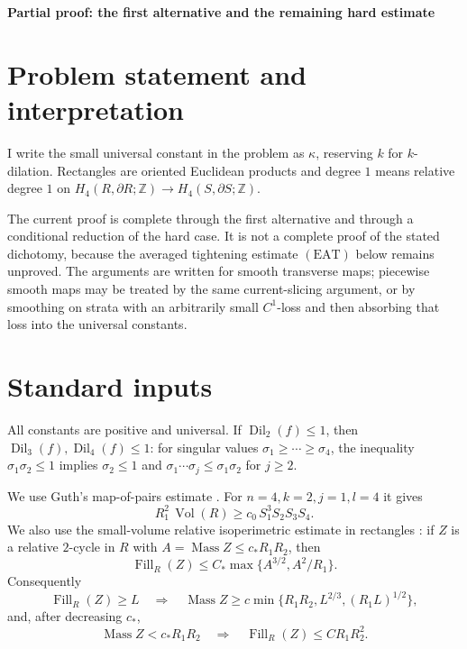 \documentclass[12pt]{article}
\newcommand{\Dil}{\operatorname{Dil}}
\newcommand{\Vol}{\operatorname{Vol}}
\newcommand{\Mass}{\operatorname{Mass}}
\newcommand{\Fill}{\operatorname{Fill}}
\begin{document}
\begin{center}
{\bf Partial proof: the first alternative and the remaining hard estimate}
\end{center}

\section*{Problem statement and interpretation}

I write the small universal constant in the problem as \(\kappa\), reserving
\(k\) for \(k\)-dilation.  Rectangles are oriented Euclidean products and
degree \(1\) means relative degree \(1\) on
\(H_4(R,\partial R;\mathbb Z)\to H_4(S,\partial S;\mathbb Z)\).

The current proof is complete through the first alternative and through a
conditional reduction of the hard case.  It is not a complete proof of the
stated dichotomy, because the averaged tightening estimate \((\mathrm{EAT})\)
below remains unproved.  The arguments are written for smooth transverse maps;
piecewise smooth maps may be treated by the same current-slicing argument, or
by smoothing on strata with an arbitrarily small \(C^1\)-loss and then
absorbing that loss into the universal constants.

\section*{Standard inputs}

All constants are positive and universal.  If \(\Dil_2(f)\le1\), then
\(\Dil_3(f),\Dil_4(f)\le1\): for singular values
\(\sigma_1\ge\cdots\ge\sigma_4\), the inequality
\(\sigma_1\sigma_2\le1\) implies \(\sigma_2\le1\) and
\(\sigma_1\cdots\sigma_j\le\sigma_1\sigma_2\) for \(j\ge2\).

We use Guth's map-of-pairs estimate \cite[Estimate 1]{GuthExpanding}.  For
\(n=4,k=2,j=1,l=4\) it gives
\begin{equation}\label{guth14}
        R_1^2\,\Vol(R)\ge c_0\,S_1^3S_2S_3S_4 .
\end{equation}
We also use the small-volume relative isoperimetric estimate in rectangles
\cite[Theorem 3]{GuthExpanding}: if \(Z\) is a relative \(2\)-cycle in \(R\)
with \(A=\Mass Z\le c_*R_1R_2\), then
\[
        \Fill_R(Z)\le C_*\max\{A^{3/2},A^2/R_1\}.
\]
Consequently
\begin{equation}\label{profile-inverse}
\Fill_R(Z)\ge L\quad\Longrightarrow\quad
\Mass Z\ge c\min\{R_1R_2,L^{2/3},(R_1L)^{1/2}\},
\end{equation}
and, after decreasing \(c_*\),
\begin{equation}\label{iso}
        \Mass Z<c_*R_1R_2\quad\Longrightarrow\quad
        \Fill_R(Z)\le C R_1R_2^2 .
\end{equation}
\end{document}
